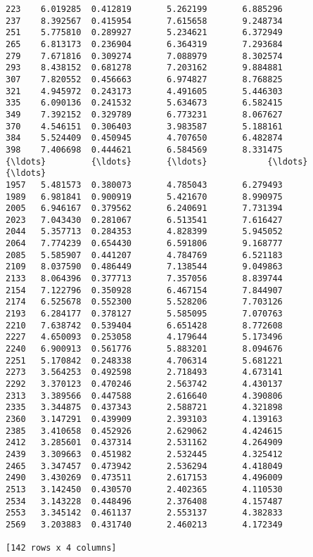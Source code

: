 \documentclass[11pt]{article}
\begin{document}
\begin{Verbatim}[commandchars=\\\{\}]
223    6.019285  0.412819       5.262199       6.885296
237    8.392567  0.415954       7.615658       9.248734
251    5.775810  0.289927       5.234621       6.372949
265    6.813173  0.236904       6.364319       7.293684
279    7.671816  0.309274       7.088979       8.302574
293    8.438152  0.681278       7.203162       9.884881
307    7.820552  0.456663       6.974827       8.768825
321    4.945972  0.243173       4.491605       5.446303
335    6.090136  0.241532       5.634673       6.582415
349    7.392152  0.329789       6.773231       8.067627
370    4.546151  0.306403       3.983587       5.188161
384    5.524409  0.450945       4.707650       6.482874
398    7.406698  0.444621       6.584569       8.331475
{\ldots}         {\ldots}       {\ldots}            {\ldots}            {\ldots}
1957   5.481573  0.380073       4.785043       6.279493
1989   6.981841  0.900919       5.421670       8.990975
2005   6.946167  0.379562       6.240691       7.731394
2023   7.043430  0.281067       6.513541       7.616427
2044   5.357713  0.284353       4.828399       5.945052
2064   7.774239  0.654430       6.591806       9.168777
2085   5.585907  0.441207       4.784769       6.521183
2109   8.037590  0.486449       7.138544       9.049863
2133   8.064396  0.377713       7.357056       8.839744
2154   7.122796  0.350928       6.467154       7.844907
2174   6.525678  0.552300       5.528206       7.703126
2193   6.284177  0.378127       5.585095       7.070763
2210   7.638742  0.539404       6.651428       8.772608
2227   4.650093  0.253058       4.179644       5.173496
2240   6.900913  0.561776       5.883201       8.094676
2251   5.170842  0.248338       4.706314       5.681221
2273   3.564253  0.492598       2.718493       4.673141
2292   3.370123  0.470246       2.563742       4.430137
2313   3.389566  0.447588       2.616640       4.390806
2335   3.344875  0.437343       2.588721       4.321898
2360   3.147291  0.439909       2.393103       4.139163
2385   3.410658  0.452926       2.629062       4.424615
2412   3.285601  0.437314       2.531162       4.264909
2439   3.309663  0.451982       2.532445       4.325412
2465   3.347457  0.473942       2.536294       4.418049
2490   3.430269  0.473511       2.617153       4.496009
2513   3.142450  0.430570       2.402365       4.110530
2534   3.143228  0.448496       2.376408       4.157487
2553   3.345142  0.461137       2.553137       4.382833
2569   3.203883  0.431740       2.460213       4.172349

[142 rows x 4 columns]

    \end{Verbatim}
\end{document}
